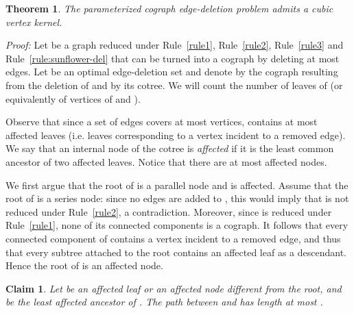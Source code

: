 \documentclass[11pt]{article}
\newenvironment{proof}{\noindent\textit{Proof: }}{{\hfill }}
\newtheorem{theorem}[lemma]{Theorem}
\newtheorem{claim}[lemma]{Claim}
\begin{document}
\begin{theorem} \label{th:deletion}
The parameterized cograph edge-deletion problem admits a cubic vertex kernel.
\end{theorem}
\begin{proof}
Let  be a graph reduced under Rule~\ref{rule1}, Rule~\ref{rule2}, Rule~\ref{rule3} and Rule~\ref{rule:sunflower-del} that can be turned into a cograph by deleting at most  edges. Let  be an optimal edge-deletion set and denote by  the cograph resulting from the deletion of  and by  its cotree. We will count the number of leaves of  (or equivalently of vertices of  and ).

Observe that since a set of  edges covers at most  vertices,  contains at most  affected leaves (i.e. leaves corresponding to a vertex incident to a removed edge).
We say that an internal node of the cotree  is \emph{affected} if it is the least common ancestor of two affected leaves. Notice that there are at most  affected nodes.

We first argue that the root of  is a parallel node and is affected. Assume that the root of  is a series node: since no edges are added to , this would imply that  is not reduced under Rule~\ref{rule2}, a contradiction. Moreover, since  is reduced under Rule~\ref{rule1}, none of its connected components is a cograph. It follows that every connected component of  contains a vertex incident to a removed edge, and thus that every subtree attached to the root contains an affected leaf as a descendant. Hence the root of  is an affected node.

\begin{claim}
\label{claim:kernel-del}
Let  be an affected leaf or an affected node different from the root, and  be the least affected ancestor of . The path between  and  has length at most .
\end{claim}


\end{proof}
\end{document}
